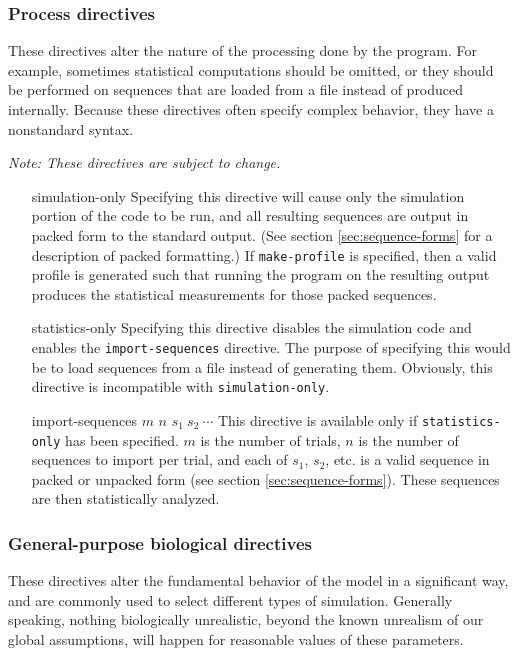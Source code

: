 \documentclass{article}
\begin{document}
      \subsubsection{Process directives}
	\label{sec:process-directives}

	These directives alter the nature of the processing done by the program.
	For example, sometimes statistical computations should be omitted, or
	they should be performed on sequences that are loaded from a file
	instead of produced internally. Because these directives often specify
	complex behavior, they have a nonstandard syntax.

	{\em Note: These directives are subject to change.}

	\begin{enumerate}
	  \item[simulation-only]
	  Specifying this directive will cause only the simulation portion of
	  the code to be run, and all resulting sequences are output in packed
	  form to the standard output. (See section \ref{sec:sequence-forms} for
	  a description of packed formatting.) If \verb|make-profile| is
	  specified, then a valid profile is generated such that running the
	  program on the resulting output produces the statistical measurements
	  for those packed sequences.

	  \item[statistics-only]
	  Specifying this directive disables the simulation code and enables the
	  \verb|import-sequences| directive. The purpose of specifying this
	  would be to load sequences from a file instead of generating them.
	  Obviously, this directive is incompatible with \verb|simulation-only|.

	  \item[import-sequences $m$ $n$ $s_1\ s_2\ \cdots$]
	  This directive is available only if \verb|statistics-only| has been
	  specified. $m$ is the number of trials, $n$ is the number of sequences
	  to import per trial, and each of $s_1$, $s_2$, etc. is a valid
	  sequence in packed or unpacked form (see section
	  \ref{sec:sequence-forms}). These sequences are then statistically
	  analyzed.
	\end{enumerate}

      \subsubsection{General-purpose biological directives}
        \label{sec:general-directives}

        These directives alter the fundamental behavior of the model in a
        significant way, and are commonly used to select different types of
        simulation. Generally speaking, nothing biologically unrealistic, beyond
        the known unrealism of our global assumptions, will happen for
        reasonable values of these parameters.
\end{document}
